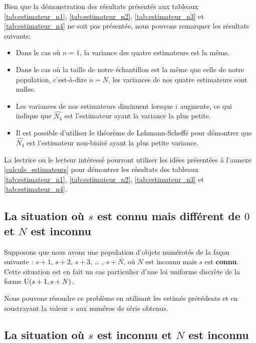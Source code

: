 \documentclass[10pt]{article}
\begin{document}
Bien que la démonstration des résultats présentés aux tableaux
\ref{tab:estimateur_n1}, \ref{tab:estimateur_n2},
\ref{tab:estimateur_n3} et \ref{tab:estimateur_n4} ne soit pas
présentée, nous pouvons remarquer les résultats suivants:

\begin{itemize}
\item
  Dans le cas où \(n=1\), la variance des quatre estimateurs est la
  même.
\item
  Dans le cas où la taille de notre échantillon est la même que celle de
  notre population, c'est-à-dire \(n=N\), les variances de nos quatre
  estimateurs sont nulles.
\item
  Les variances de nos estimateurs diminuent lorsque \(i\) augmente, ce
  qui indique que \(\widehat{N_4}\) est l'estimateur ayant la variance
  la plus petite.
\item
  Il est possible d'utiliser le théorème de Lehmann-Scheffé pour
  démontrer que \(\widehat{N_4}\) est l'estimateur non-biaisé ayant la
  plus petite variance.
\end{itemize}

La lectrice ou le lecteur intéressé pourront utiliser les idées
présentées à l'annexe \ref{calculs_estimateurs} pour démontrer les
résultats des tableaux \ref{tab:estimateur_n1}, \ref{tab:estimateur_n2},
\ref{tab:estimateur_n3} et \ref{tab:estimateur_n4}.

\hypertarget{la-situation-ou-s-est-connu-mais-different-de-0-et-n-est-inconnu}{%
\subsection{\texorpdfstring{La situation où \(s\) est \textbf{connu}
mais différent de \(0\) et \(N\) est
\textbf{inconnu}}{La situation où s est connu mais différent de 0 et N est inconnu}}\label{la-situation-ou-s-est-connu-mais-different-de-0-et-n-est-inconnu}}

Supposons que nous avons une population d'objets numérotés de la façon
suivante : \(s+1\), \(s+2\), \(s+3\), \ldots{} , \(s+N\), où \(N\) est
inconnu mais \(s\) est \textbf{connu}. Cette situation est en fait un
cas particulier d'une loi uniforme discrète de la forme
\(\operatorname{U}(s+1,s+N)\).

Nous pouvons résoudre ce problème en utilisant les estimés précédents et
en soustrayant la valeur \(s\) aux numéros de série obtenus.

\hypertarget{la-situation-ou-s-est-inconnu-et-n-est-inconnu}{%
\subsection{\texorpdfstring{La situation où \(s\) est \textbf{inconnu}
et \(N\) est
\textbf{inconnu}}{La situation où s est inconnu et N est inconnu}}\label{la-situation-ou-s-est-inconnu-et-n-est-inconnu}}
\end{document}
